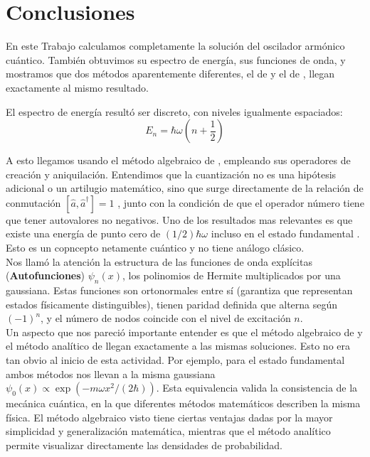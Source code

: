 \chapter{Conclusiones}
En este Trabajo calculamos completamente la solución del oscilador armónico cuántico. También obtuvimos su espectro de energía, sus funciones de onda, y mostramos que dos métodos aparentemente diferentes, el de \cite{schrodinger1926a} y el de \cite{dirac1930}, llegan exactamente al mismo resultado.

El espectro de energía resultó ser discreto, con niveles igualmente espaciados:
\vspace{-5pt}
\begin{equation*}
E_n = \hbar\omega\left(n + \frac{1}{2}\right)
\end{equation*}

A esto llegamos usando el método algebraico de \cite{dirac1930}, empleando sus operadores de creación y aniquilación. Entendimos que la cuantización no es una hipótesis adicional o un artilugio matemático, sino que surge directamente de la relación de conmutación $[\hat{a}, \hat{a}^\dagger] = 1$ \citep{bornheisenberg1926}, junto con la condición de que el operador número tiene que tener autovalores no negativos. Uno de los resultados mas relevantes es que existe una energía de punto cero de $(1/2)\hbar\omega$ incluso en el estado fundamental \citep{planck1911}. Esto es un copncepto netamente cuántico y no tiene análogo clásico.\\

Nos llamó la atención la estructura de las funciones de onda explícitas (\textbf{Autofunciones}) $\psi_n(x)$, los polinomios de Hermite multiplicados por una gaussiana. Estas funciones son ortonormales entre sí (garantiza que representan estados físicamente distinguibles), tienen paridad definida que alterna según $(-1)^n$, y el número de nodos coincide con el nivel de excitación $n$.\\

Un aspecto que nos pareció importante entender es que el método algebraico de \cite{dirac1930} y el método analítico de \cite{schrodinger1926a} llegan exactamente a las mismas soluciones. Esto no era tan obvio al inicio de esta actividad. Por ejemplo, para el estado fundamental ambos métodos nos llevan a la misma gaussiana $\psi_0(x) \propto \exp(-m\omega x^2/(2\hbar))$. Esta equivalencia valida la consistencia de la mecánica cuántica, en la que diferentes métodos matemáticos describen la misma física. El método algebraico visto tiene ciertas ventajas dadas por la mayor simplicidad y generalización matemática, mientras que el método analítico permite visualizar directamente las densidades de probabilidad.\\

